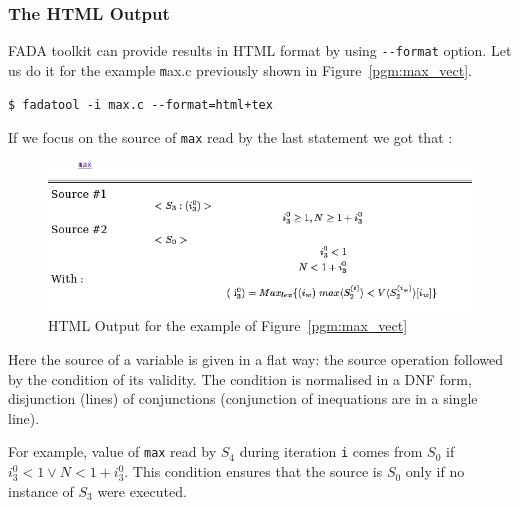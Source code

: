 



\subsubsection{The HTML Output}
FADA toolkit can provide results in HTML format by using \verb|--format| option. Let us do it for the example {\texttt max.c} previously shown in Figure~\ref{pgm:max_vect}. 

\begin{verbatim}
$ fadatool -i max.c --format=html+tex
\end{verbatim}

If we focus on the source of \verb|max| read by the last statement we got that :
\begin{figure}
 \begin{center}
 \includegraphics[scale=0.60]{html_tex.png}
\end{center}
\caption{HTML Output for the example of Figure~\ref{pgm:max_vect}}
\label{output:html}
\end{figure}

Here the source of a variable is given in a flat way: the source operation followed by the condition of its validity. The condition is normalised in a DNF form, disjunction (lines) of conjunctions (conjunction of inequations are in a single line).

For example, value of \verb|max| read by $S_4$ during iteration \verb|i| comes from $S_0$ if  $i_3^0 < 1 \vee N < 1 + i_3^0$. This condition ensures that the source is $S_0$ only if no instance of $S_3$ were executed.

